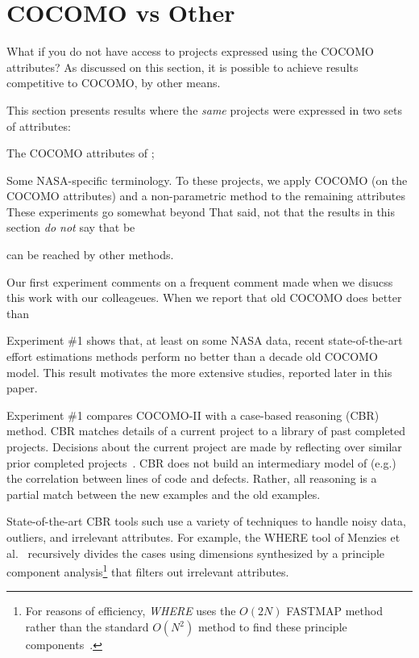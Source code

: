 
\section{COCOMO vs Other}\label{sect:other}

What if you do not have access to projects
expressed using the COCOMO attributes?
As
discussed on this section, it is possible
to achieve results competitive
to COCOMO, by other means.

This section presents results where the {\em same} projects
were expressed in two sets of attributes:
\bi
\item The COCOMO attributes of ;
\item Some NASA-specific terminology.
\ie
To these projects, we apply COCOMO (on the COCOMO attributes)
and a non-parametric method to the remaining attributes
These experiments go somewhat beyond 
That said, not that the results in this section 
{\em do not} say that be

  can be reached by other methods.

Our first experiment comments on 
a frequent comment made when we disucss this
work with our colleageues. When we report
that old COCOMO does better than


 
Experiment \#1 shows that, at least on some NASA data,
recent state-of-the-art effort estimations methods
perform no better than a decade old COCOMO model.
This result motivates the more extensive studies, reported later in this paper.

Experiment \#1 compares COCOMO-II with a 
case-based reasoning (CBR) method.
CBR matches details  of a current
project to a library of past completed projects. Decisions about the
current project are made by reflecting over similar 
prior completed projects~\cite{schank77a,kol93}.
CBR does not build an intermediary model of
(e.g.) the correlation between lines of code and defects. Rather,
all reasoning is a partial match between the new examples and the old
examples.



State-of-the-art CBR tools such 
use a variety of techniques to handle
noisy data, outliers, and irrelevant attributes.
For example, the WHERE tool of Menzies et al.~\cite{me11m}
recursively divides the cases using dimensions
synthesized by a 
principle component analysis\footnote{For reasons of efficiency, {\em WHERE}
  uses the $O(2N)$ FASTMAP
  method~\cite{platt05,Faloutsos1995} rather than
  the standard $O(N^2)$ method to find these
  principle components~\cite{Du2008}.} that filters out irrelevant attributes.


